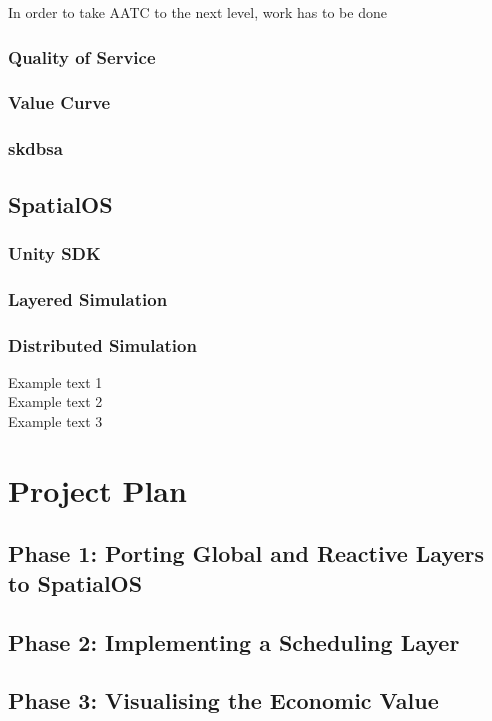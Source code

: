 \documentclass[a4paper,12pt,titlepage]{article}
\begin{document}
In order to take AATC to the next level, work has to be done 

\subsubsection{Quality of Service}
\subsubsection{Value Curve}
\subsubsection{skdbsa}

\subsection{SpatialOS}
\subsubsection{Unity SDK}
\subsubsection{Layered Simulation}
\subsubsection{Distributed Simulation}
Example text 1\\

Example text 2\\

Example text 3

\newpage
\section{Project Plan}
\subsection{Phase 1: Porting Global and Reactive Layers to SpatialOS}
\subsection{Phase 2: Implementing a Scheduling Layer}
\subsection{Phase 3: Visualising the Economic Value}
\end{document}

